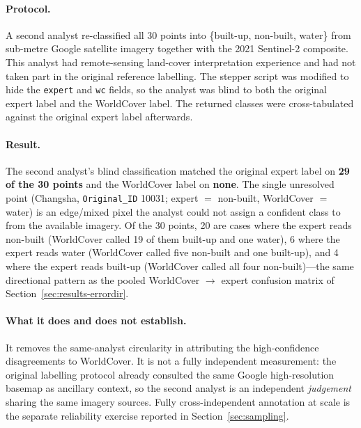 \documentclass[remotesensing,article,submit,moreauthors]{Definitions/mdpi}
\begin{document}
\paragraph{Protocol.} A second analyst re-classified all 30 points into
\{built-up, non-built, water\} from sub-metre Google satellite imagery together
with the 2021 Sentinel-2 composite. This analyst had remote-sensing land-cover
interpretation experience and had not taken part in the original reference
labelling. The stepper script was modified to hide the \texttt{expert} and
\texttt{wc} fields, so the analyst was blind to both the original expert label
and the WorldCover label. The returned classes were cross-tabulated against the
original expert label afterwards.

\paragraph{Result.} The second analyst's blind classification matched the
original expert label on \textbf{29 of the 30 points} and the WorldCover label
on \textbf{none}. The single unresolved point (Changsha, \texttt{Original\_ID}
10031; expert $=$ non-built, WorldCover $=$ water) is an edge/mixed pixel the
analyst could not assign a confident class to from the available imagery. Of
the 30 points, 20 are cases where the expert reads non-built (WorldCover called
19 of them built-up and one water), 6 where the expert reads water (WorldCover
called five non-built and one built-up), and 4 where the expert reads built-up
(WorldCover called all four non-built)---the same directional pattern as the
pooled WorldCover $\to$ expert confusion matrix of
Section~\ref{sec:results-errordir}.

\paragraph{What it does and does not establish.} It removes the same-analyst
circularity in attributing the high-confidence disagreements to WorldCover. It
is not a fully independent measurement: the original labelling protocol already
consulted the same Google high-resolution basemap as ancillary context, so the
second analyst is an independent \emph{judgement} sharing the same imagery
sources. Fully cross-independent annotation at scale is the separate
reliability exercise reported in Section~\ref{sec:sampling}.
\end{document}
